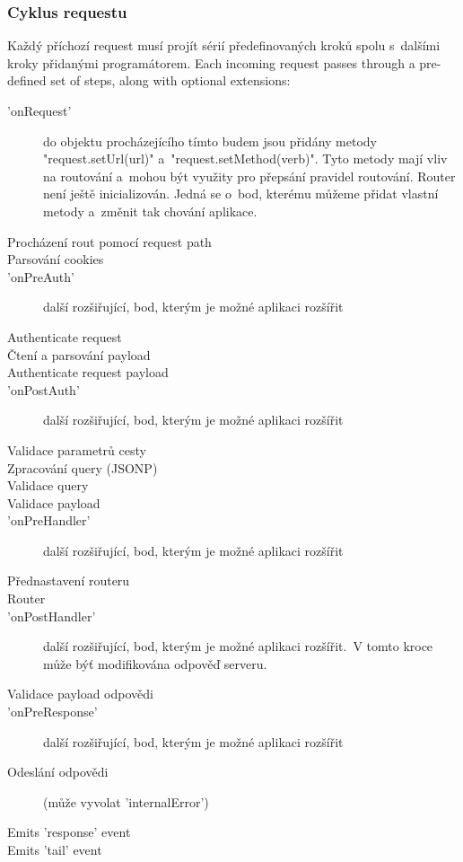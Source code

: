 \documentclass[a4paper,12pt,twoside,BCOR=10mm]{article}
\begin{document}
\subsubsection{Cyklus requestu}
Každý příchozí request musí projít sérií předefinovaných kroků spolu s~dalšími kroky přidanými programátorem.
Each incoming request passes through a pre-defined set of steps, along with optional extensions\cite{hapiJSDOC}:
\begin{description}
\item['onRequest'] do objektu procházejícího tímto budem jsou přidány metody "request.setUrl(url)" a~"request.setMethod(verb)". Tyto metody mají vliv na routování a~mohou být využity pro přepsání pravidel routování. Router není ještě inicializován. Jedná se o~bod, kterému můžeme přidat vlastní metody a~změnit tak chování aplikace.
\item[Procházení rout pomocí request path]
\item[Parsování cookies]
\item['onPreAuth'] další rozšiřující, bod, kterým je možné aplikaci rozšířit
\item[Authenticate request]
\item[Čtení a parsování payload]
\item[Authenticate request payload]
\item['onPostAuth'] další rozšiřující, bod, kterým je možné aplikaci rozšířit
\item[Validace parametrů cesty]
\item[Zpracování query (JSONP)]
\item[Validace query]
\item[Validace payload]
\item['onPreHandler'] další rozšiřující, bod, kterým je možné aplikaci rozšířit
\item[Přednastavení routeru]
\item[Router]
\item['onPostHandler'] další rozšiřující, bod, kterým je možné aplikaci rozšířit. V tomto kroce může býť modifikována odpověď serveru.
\item[Validace payload odpovědi]
\item['onPreResponse'] další rozšiřující, bod, kterým je možné aplikaci rozšířit
\item[Odeslání odpovědi] (může vyvolat 'internalError')
\item[Emits 'response' event]
\item[Emits 'tail' event]
\end{description}
\end{document}
